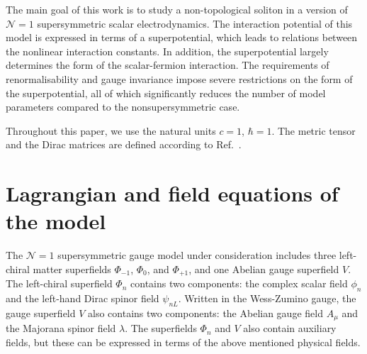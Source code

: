 The main goal of this work  is  to study a non-topological soliton in a version
of $\mathcal{N}  =  1$  supersymmetric  scalar electrodynamics.
The interaction  potential  of   this   model   is   expressed  in  terms  of a
superpotential, which  leads  to  relations  between  the nonlinear interaction
constants.
In addition,   the   superpotential   largely   determines   the   form  of the
scalar-fermion interaction.
The  requirements  of  renormalisability  and  gauge  invariance  impose severe
restrictions on  the  form  of  the  superpotential, all of which significantly
reduces the number of  model parameters compared to the nonsupersymmetric case.


Throughout this paper, we use the natural units $c = 1$, $\hbar = 1$.
The metric  tensor   and   the   Dirac  matrices   are   defined   according to
Ref.~\cite{Weinberg_III}.

\section{Lagrangian and field equations of the model} \label{seq:II}

The $\mathcal{N} = 1$ supersymmetric gauge  model  under consideration includes
three left-chiral matter  superfields $\Phi_{-1}$, $\Phi_{0}$, and $\Phi_{+1}$,
and one Abelian gauge superfield $V$.
The left-chiral  superfield  $\Phi_{n}$  contains  two  components: the complex
scalar field $\phi_{n}$ and the left-hand   Dirac  spinor  field  $\psi_{n L}$.
Written in the Wess-Zumino gauge,  the  gauge  superfield $V$ also contains two
components: the Abelian gauge field  $A_{\mu}$  and  the  Majorana spinor field
$\lambda$.
The superfields $\Phi_{n}$ and $V$ also contain auxiliary fields, but these can
be expressed in terms of the above mentioned physical fields.


